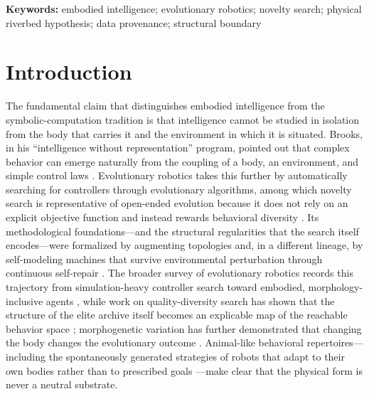 \documentclass[11pt]{article}
\begin{document}
\noindent\textbf{Keywords:} embodied intelligence; evolutionary robotics; novelty search; physical riverbed hypothesis; data provenance; structural boundary

\section{Introduction}
\label{sec:intro}

The fundamental claim that distinguishes embodied intelligence from the symbolic-computation tradition is that intelligence cannot be studied in isolation from the body that carries it and the environment in which it is situated. Brooks, in his ``intelligence without representation'' program, pointed out that complex behavior can emerge naturally from the coupling of a body, an environment, and simple control laws \cite{brooks1991}. Evolutionary robotics takes this further by automatically searching for controllers through evolutionary algorithms, among which novelty search is representative of open-ended evolution because it does not rely on an explicit objective function and instead rewards behavioral diversity \cite{lehman2011}. Its methodological foundations---and the structural regularities that the search itself encodes---were formalized by augmenting topologies \cite{stanley2002} and, in a different lineage, by self-modeling machines that survive environmental perturbation through continuous self-repair \cite{bongard2006}. The broader survey of evolutionary robotics records this trajectory from simulation-heavy controller search toward embodied, morphology-inclusive agents \cite{doncieux2015}, while work on quality-diversity search has shown that the structure of the elite archive itself becomes an explicable map of the reachable behavior space \cite{mouret2015}; morphogenetic variation has further demonstrated that changing the body changes the evolutionary outcome \cite{bongard2011}. Animal-like behavioral repertoires---including the spontaneously generated strategies of robots that adapt to their own bodies rather than to prescribed goals \cite{cully2015}---make clear that the physical form is never a neutral substrate.
\end{document}
